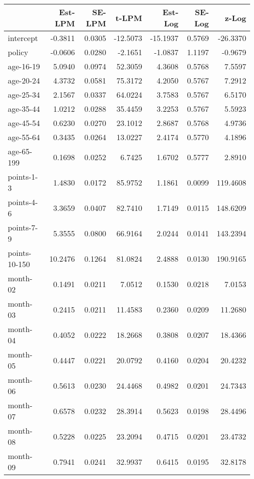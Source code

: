 \documentclass[10pt]{article}
\begin{document}
\begin{table}[ht]
\centering
\begin{tabular}{lrrrrrr}
  \hline
 & Est-LPM & SE-LPM & t-LPM & Est-Log & SE-Log & z-Log \\ 
  \hline
intercept & -0.3811 & 0.0305 & -12.5073 & -15.1937 & 0.5769 & -26.3370 \\ 
  policy & -0.0606 & 0.0280 & -2.1651 & -1.0837 & 1.1197 & -0.9679 \\ 
  age-16-19 & 5.0940 & 0.0974 & 52.3059 & 4.3608 & 0.5768 & 7.5597 \\ 
  age-20-24 & 4.3732 & 0.0581 & 75.3172 & 4.2050 & 0.5767 & 7.2912 \\ 
  age-25-34 & 2.1567 & 0.0337 & 64.0224 & 3.7583 & 0.5767 & 6.5170 \\ 
  age-35-44 & 1.0212 & 0.0288 & 35.4459 & 3.2253 & 0.5767 & 5.5923 \\ 
  age-45-54 & 0.6230 & 0.0270 & 23.1012 & 2.8687 & 0.5768 & 4.9736 \\ 
  age-55-64 & 0.3435 & 0.0264 & 13.0227 & 2.4174 & 0.5770 & 4.1896 \\ 
  age-65-199 & 0.1698 & 0.0252 & 6.7425 & 1.6702 & 0.5777 & 2.8910 \\ 
  points-1-3 & 1.4830 & 0.0172 & 85.9752 & 1.1861 & 0.0099 & 119.4608 \\ 
  points-4-6 & 3.3659 & 0.0407 & 82.7410 & 1.7149 & 0.0115 & 148.6209 \\ 
  points-7-9 & 5.3555 & 0.0800 & 66.9164 & 2.0244 & 0.0141 & 143.2394 \\ 
  points-10-150 & 10.2476 & 0.1264 & 81.0824 & 2.4888 & 0.0130 & 190.9165 \\ 
  month-02 & 0.1491 & 0.0211 & 7.0512 & 0.1530 & 0.0218 & 7.0153 \\ 
  month-03 & 0.2415 & 0.0211 & 11.4583 & 0.2360 & 0.0209 & 11.2680 \\ 
  month-04 & 0.4052 & 0.0222 & 18.2668 & 0.3808 & 0.0207 & 18.4366 \\ 
  month-05 & 0.4447 & 0.0221 & 20.0792 & 0.4160 & 0.0204 & 20.4232 \\ 
  month-06 & 0.5613 & 0.0230 & 24.4468 & 0.4982 & 0.0201 & 24.7343 \\ 
  month-07 & 0.6578 & 0.0232 & 28.3914 & 0.5623 & 0.0198 & 28.4496 \\ 
  month-08 & 0.5228 & 0.0225 & 23.2094 & 0.4715 & 0.0201 & 23.4732 \\ 
  month-09 & 0.7941 & 0.0241 & 32.9937 & 0.6415 & 0.0195 & 32.8178 \\ 

\end{tabular}
\end{table}
\end{document}

